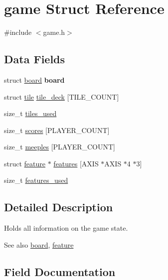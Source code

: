 \hypertarget{structgame}{}\section{game Struct Reference}
\label{structgame}


{\ttfamily \#include $<$game.\+h$>$}

\subsection*{Data Fields}
\begin{DoxyCompactItemize}
\item 
\hypertarget{structgame_a9d3643a21132d20682823fa077528f05}{}\label{structgame_a9d3643a21132d20682823fa077528f05} 
struct \hyperlink{structboard}{board} {\bfseries board}
\item 
struct \hyperlink{structtile}{tile} \hyperlink{structgame_ace0a9bc6809946175359836addeea842}{tile\+\_\+deck} \mbox{[}T\+I\+L\+E\+\_\+\+C\+O\+U\+NT\mbox{]}
\item 
size\+\_\+t \hyperlink{structgame_a3ba14fb93302c82593ca2865b69718cb}{tiles\+\_\+used}
\item 
size\+\_\+t \hyperlink{structgame_a727e232254a3086b4086da0fbf16ea00}{scores} \mbox{[}P\+L\+A\+Y\+E\+R\+\_\+\+C\+O\+U\+NT\mbox{]}
\item 
size\+\_\+t \hyperlink{structgame_a8f23c0f5156ea251a207383a01da063d}{meeples} \mbox{[}P\+L\+A\+Y\+E\+R\+\_\+\+C\+O\+U\+NT\mbox{]}
\item 
struct \hyperlink{structfeature}{feature} $\ast$ \hyperlink{structgame_a7503b1d02295092f74671a8fca9b80e1}{features} \mbox{[}A\+X\+IS $\ast$A\+X\+IS $\ast$4 $\ast$3\mbox{]}
\item 
size\+\_\+t \hyperlink{structgame_a5f38a6f289ba78fbdf22f092433ae522}{features\+\_\+used}
\end{DoxyCompactItemize}


\subsection{Detailed Description}
Holds all information on the game state. \begin{DoxySeeAlso}{See also}
\hyperlink{structboard}{board}, \hyperlink{structfeature}{feature} 
\end{DoxySeeAlso}


\subsection{Field Documentation}
\hypertarget{structgame_a7503b1d02295092f74671a8fca9b80e1}{}\label{structgame_a7503b1d02295092f74671a8fca9b80e1} 
